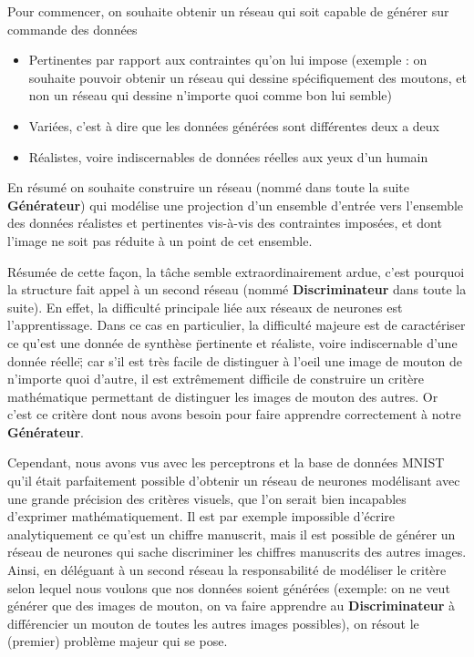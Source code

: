 Pour commencer, on souhaite obtenir un réseau qui soit capable de générer sur commande des données 
\begin{itemize}
    \item Pertinentes par rapport aux contraintes qu'on lui impose (exemple : on souhaite pouvoir obtenir un réseau qui dessine spécifiquement des moutons, et non un réseau qui dessine n'importe quoi comme bon lui semble)
    \item Variées, c'est à dire que les données générées sont différentes deux a deux
    \item Réalistes, voire indiscernables de données réelles aux yeux d'un humain \\
\end{itemize} 

En résumé on souhaite construire un réseau (nommé dans toute la suite \textbf{Générateur}) qui modélise une projection d'un ensemble d'entrée vers l'ensemble des données réalistes et pertinentes vis-à-vis des contraintes imposées, et dont l'image ne soit pas réduite à un point de cet ensemble.

Résumée de cette façon, la tâche semble extraordinairement ardue, c'est pourquoi la structure fait appel à un second réseau (nommé \textbf{Discriminateur} dans toute la suite). En effet, la difficulté principale liée aux réseaux de neurones est l'apprentissage. Dans ce cas en particulier, la difficulté majeure  est de caractériser ce qu'est une donnée de synthèse \"pertinente et réaliste, voire indiscernable d'une donnée réelle\"; car s'il est très facile de distinguer à l'oeil une image de mouton de n'importe quoi d'autre, il est extrêmement difficile de construire un critère mathématique permettant de distinguer les images de mouton des autres. Or c'est ce critère dont nous avons besoin pour faire apprendre correctement à notre \textbf{Générateur}.

Cependant, nous avons vus avec les perceptrons et la base de données MNIST qu'il était parfaitement possible d'obtenir un réseau de neurones modélisant avec une grande précision des critères visuels, que l'on serait bien incapables d'exprimer mathématiquement. Il est par exemple impossible d'écrire analytiquement ce qu'est un chiffre manuscrit, mais il est possible de générer un réseau de neurones qui sache discriminer les chiffres manuscrits des autres images. Ainsi, en déléguant à un second réseau la responsabilité de modéliser le critère selon lequel nous voulons que nos données soient générées (exemple: on ne veut générer que des images de mouton, on va faire apprendre au \textbf{Discriminateur} à différencier un mouton de toutes les autres images possibles), on résout le (premier) problème majeur qui se pose. 

